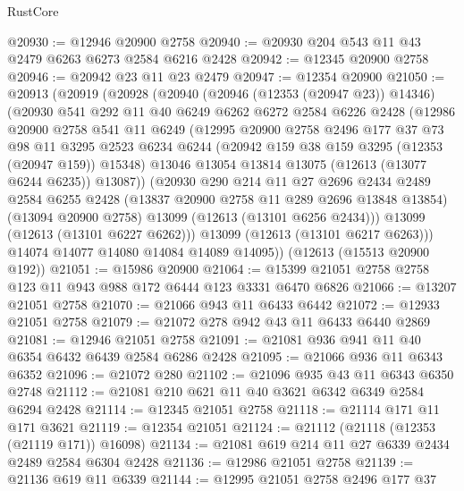 \begin{lexlean}{RustCore}
\begin{coremodule}
@20930 := @12946 @20900 @2758
@20940 := @20930 @204 @543 @11 @43 @2479 @6263 @6273 @2584 @6216 @2428
@20942 := @12345 @20900 @2758
@20946 := @20942 @23 @11 @23 @2479
@20947 := @12354 @20900
@21050 := @20913
    (@20919
      (@20928
        (@20940
          (@20946 (@12353 (@20947 @23)) @14346)
          (@20930
            @541
            @292
            @11
            @40
            @6249
            @6262
            @6272
            @2584
            @6226
            @2428
            (@12986
              @20900
              @2758
              @541
              @11
              @6249
              (@12995
                @20900
                @2758
                @2496
                @177
                @37
                @73
                @98
                @11
                @3295
                @2523
                @6234
                @6244
                (@20942 @159 @38 @159 @3295 (@12353 (@20947 @159)) @15348)
                @13046
                @13054
                @13814
                @13075
                (@12613 (@13077 @6244 @6235))
                @13087))
            (@20930
              @290
              @214
              @11
              @27
              @2696
              @2434
              @2489
              @2584
              @6255
              @2428
              (@13837 @20900 @2758 @11 @289 @2696 @13848 @13854)
              (@13094 @20900 @2758)
              @13099
              (@12613 (@13101 @6256 @2434)))
            @13099
            (@12613 (@13101 @6227 @6262)))
          @13099
          (@12613 (@13101 @6217 @6263)))
        @14074
        @14077
        @14080
        @14084
        @14089
        @14095))
    (@12613 (@15513 @20900 @192))
@21051 := @15986 @20900
@21064 := @15399 @21051 @2758 @2758 @123 @11 @943 @988 @172 @6444 @123 @3331 @6470 @6826
@21066 := @13207 @21051 @2758
@21070 := @21066 @943 @11 @6433 @6442
@21072 := @12933 @21051 @2758
@21079 := @21072 @278 @942 @43 @11 @6433 @6440 @2869
@21081 := @12946 @21051 @2758
@21091 := @21081 @936 @941 @11 @40 @6354 @6432 @6439 @2584 @6286 @2428
@21095 := @21066 @936 @11 @6343 @6352
@21096 := @21072 @280
@21102 := @21096 @935 @43 @11 @6343 @6350 @2748
@21112 := @21081 @210 @621 @11 @40 @3621 @6342 @6349 @2584 @6294 @2428
@21114 := @12345 @21051 @2758
@21118 := @21114 @171 @11 @171 @3621
@21119 := @12354 @21051
@21124 := @21112 (@21118 (@12353 (@21119 @171)) @16098)
@21134 := @21081 @619 @214 @11 @27 @6339 @2434 @2489 @2584 @6304 @2428
@21136 := @12986 @21051 @2758
@21139 := @21136 @619 @11 @6339
@21144 := @12995 @21051 @2758 @2496 @177 @37

\end{coremodule}
\end{lexlean}
